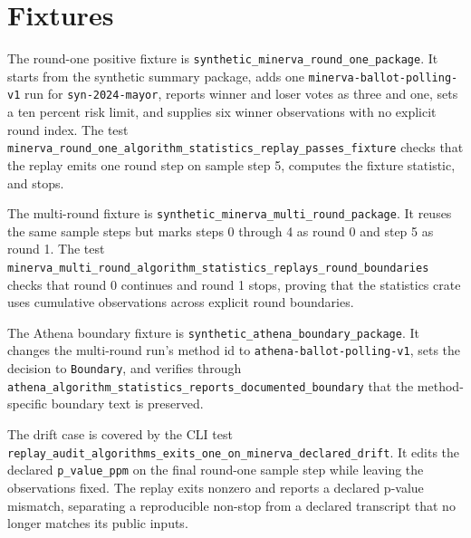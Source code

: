 \section{Fixtures}

The round-one positive fixture is
\texttt{synthetic\_minerva\_round\_one\_package}. It starts from the synthetic
summary package, adds one \texttt{minerva-ballot-polling-v1} run for
\texttt{syn-2024-mayor}, reports winner and loser votes as three and one, sets
a ten percent risk limit, and supplies six winner observations with no explicit
round index. The test
\texttt{minerva\_round\_one\_algorithm\_statistics\_replay\_passes\_fixture}
checks that the replay emits one round step on sample step 5, computes the
fixture statistic, and stops.

The multi-round fixture is
\texttt{synthetic\_minerva\_multi\_round\_package}. It reuses the same sample
steps but marks steps 0 through 4 as round 0 and step 5 as round 1. The test
\texttt{minerva\_multi\_round\_algorithm\_statistics\_replays\_round\_boundaries}
checks that round 0 continues and round 1 stops, proving that the statistics
crate uses cumulative observations across explicit round boundaries.

The Athena boundary fixture is
\texttt{synthetic\_athena\_boundary\_package}. It changes the multi-round run's
method id to \texttt{athena-ballot-polling-v1}, sets the decision to
\texttt{Boundary}, and verifies through
\texttt{athena\_algorithm\_statistics\_reports\_documented\_boundary} that the
method-specific boundary text is preserved.

The drift case is covered by the CLI test
\texttt{replay\_audit\_algorithms\_exits\_one\_on\_minerva\_declared\_drift}.
It edits the declared \texttt{p\_value\_ppm} on the final round-one sample
step while leaving the observations fixed. The replay exits nonzero and reports
a declared p-value mismatch, separating a reproducible non-stop from a declared
transcript that no longer matches its public inputs.
